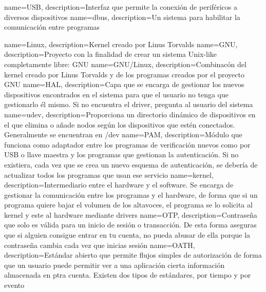 \makeglossaries


{
	name=USB,
	description={Interfaz que permite la conexión de periféricos a diversos dispositivos}
}
{
	name=dbus,
	description={Un sistema para habilitar la comunicación entre programas}
}

{
	name=Linux,
	description={Kernel creado por Linus Torvalds}
}
{
	name=GNU,
	description={Proyecto con la finalidad de crear un sistema Unix-like completamente libre: GNU}
}
{
	name=GNU/Linux,
	description={Combinacón del kernel creado por Linus Torvalds y de los programas creados por el proyecto GNU}
}
{
	name=HAL,
	description={Capa que se encarga de gestionar los nuevos dispositivos encontrados en el sistema para que el usuario no tenga que gestionarlo él mismo. Si no encuentra el driver, pregunta al usuario del sistema}
}
{
	name=udev,
	description={Proporciona un directorio dinámico de dispositivos en el que elimina o añade nodos según los dispositivos que estén conectados. Generalmente se encuentran en /dev}
}
{
	name=PAM,
	description={Módulo que funciona como adaptador entre los programas de verificación nuevos como por USB o llave maestra y los programas que gestionan la autenticación. Si no existiera, cada vez que se crea un nuevo esquema de autenticación, se debería de actualizar todos los programas que usan ese servicio}
}
{
	name=kernel,
	description={Intermediario entre el hardware y el software. Se encarga de gestionar la comunicación entre los programas y el hardware, de forma que si un programa quiere bajar el volumen de los altavoces, el programa se lo solicita al kernel y este al hardware mediante drivers}
}
{
	name=OTP,
	description={Contraseña que solo es válida para un inicio de sesión o transacción. De esta forma aseguras que si alguien consigue entrar en tu cuenta, no pueda abusar de ella porque la contraseña cambia cada vez que inicias sesión}
}
{
	name=OATH,
	description={Estándar abierto que permite flujos simples de autorización de forma que un usuario puede permitir ver a una aplicación cierta información almacenada en ptra cuenta. Existen dos tipos de estándares, por tiempo y por evento}
}
